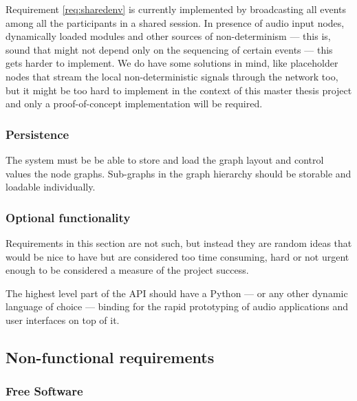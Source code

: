 \begin{mynote}
  Requirement \ref{req:sharedenv} is currently implemented by
  broadcasting all events among all the participants in a shared
  session. In presence of audio input nodes, dynamically loaded
  modules and other sources of non-determinism --- this is, sound that
  might not depend only on the sequencing of certain events --- this
  gets harder to implement. We do have some solutions in mind, like
  placeholder nodes that stream the local non-deterministic signals
  through the network too, but it might be too hard to implement in
  the context of this master thesis project and only a
  proof-of-concept implementation will be required.
\end{mynote}


\subsubsection{Persistence}

\begin{requirement}
\label{req:persistence}
The system must be be able to store and load the graph layout and
control values the node graphs. Sub-graphs in the graph hierarchy
should be storable and loadable individually.
\end{requirement}

\subsubsection{Optional functionality}

Requirements in this section are not such, but instead they are random
ideas that would be nice to have but are considered too time
consuming, hard or not urgent enough to be considered a measure of the
project success.

\begin{requirement}
  The highest level part of the API should have a Python --- or any
  other dynamic language of choice --- binding for the rapid
  prototyping of audio applications and user interfaces on top of it.
\end{requirement}

\subsection{Non-functional requirements}

\subsubsection{Free Software}

